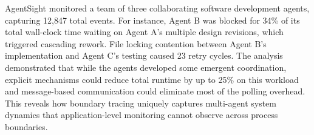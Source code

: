 AgentSight monitored a team of three collaborating software development agents, capturing 12,847 total events. For instance, Agent B was blocked for 34\% of its total wall-clock time waiting on Agent A's multiple design revisions, which triggered cascading rework. File locking contention between Agent B's implementation and Agent C's testing caused 23 retry cycles. The analysis demonstrated that while the agents developed some emergent coordination, explicit mechanisms could reduce total runtime by up to 25\% on this workload and message-based communication could eliminate most of the polling overhead. This reveals how boundary tracing uniquely captures multi-agent system dynamics that application-level monitoring cannot observe across process boundaries.





